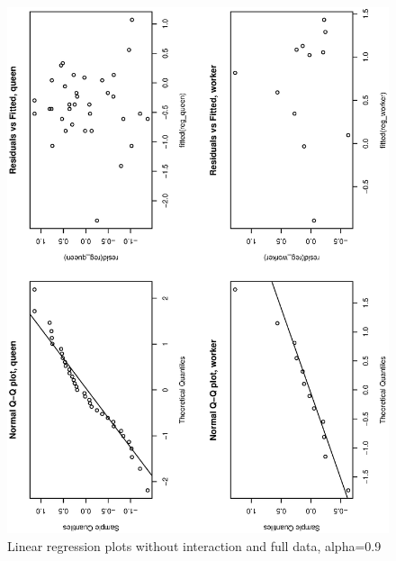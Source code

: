 \documentclass[a4paper,10pt]{article}
\begin{document}
\begin{figure}
\includegraphics[angle=-90, width=1\textwidth]{figures/math650_hw8_fig2_alpha0_9.eps}
\caption{Linear regression plots without interaction and full data, alpha=0.9}\label{f2}
\end{figure}
\end{document}
